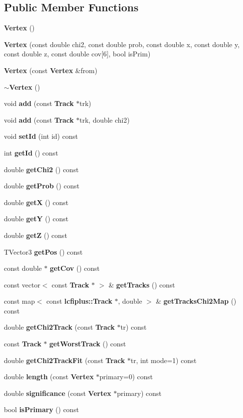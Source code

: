 \subsection*{Public Member Functions}
\begin{DoxyCompactItemize}
\item 
\textbf{ Vertex} ()
\item 
\textbf{ Vertex} (const double chi2, const double prob, const double x, const double y, const double z, const double cov[6], bool is\+Prim)
\item 
\textbf{ Vertex} (const \textbf{ Vertex} \&from)
\item 
\textbf{ $\sim$\+Vertex} ()
\item 
void \textbf{ add} (const \textbf{ Track} $\ast$trk)
\item 
void \textbf{ add} (const \textbf{ Track} $\ast$trk, double chi2)
\item 
void \textbf{ set\+Id} (int id) const
\item 
int \textbf{ get\+Id} () const
\item 
double \textbf{ get\+Chi2} () const
\item 
double \textbf{ get\+Prob} () const
\item 
double \textbf{ getX} () const
\item 
double \textbf{ getY} () const
\item 
double \textbf{ getZ} () const
\item 
T\+Vector3 \textbf{ get\+Pos} () const
\item 
const double $\ast$ \textbf{ get\+Cov} () const
\item 
const vector$<$ const \textbf{ Track} $\ast$ $>$ \& \textbf{ get\+Tracks} () const
\item 
const map$<$ const \textbf{ lcfiplus\+::\+Track} $\ast$, double $>$ \& \textbf{ get\+Tracks\+Chi2\+Map} () const
\item 
double \textbf{ get\+Chi2\+Track} (const \textbf{ Track} $\ast$tr) const
\item 
const \textbf{ Track} $\ast$ \textbf{ get\+Worst\+Track} () const
\item 
double \textbf{ get\+Chi2\+Track\+Fit} (const \textbf{ Track} $\ast$tr, int mode=1) const
\item 
double \textbf{ length} (const \textbf{ Vertex} $\ast$primary=0) const
\item 
double \textbf{ significance} (const \textbf{ Vertex} $\ast$primary) const
\item 
bool \textbf{ is\+Primary} () const

\end{DoxyCompactItemize}
